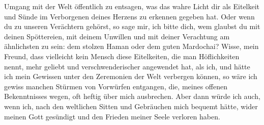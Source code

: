 Umgang mit der Welt öffentlich zu entsagen, was das wahre Licht dir als
Eitelkeit und Sünde im Verborgenen deines Herzens zu
erkennen gegeben hat. Oder
wenn du zu unseren Verächtern gehörst, so sage mir, ich bitte dich, wem glaubst
du mit deinen Spöttereien, mit deinem Unwillen und mit deiner Verachtung am
ähnlichsten zu sein: dem stolzen Haman
 oder dem guten Mardochai? Wisse, mein
Freund, dass vielleicht kein Mensch diese Eitelkeiten, die man Höflichkeiten
nennt, mehr geliebt und verschwenderischer angewendet hat, als ich, und hätte
ich mein Gewissen unter den Zeremonien der Welt verbergen können, so wäre ich
gewiss manchen Stürmen von Vorwürfen entgangen, die, meines offenen
Bekenntnisses
wegen, oft heftig über mich ausbrechen. Aber dann würde ich auch, wenn ich, nach
den weltlichen Sitten und Gebräuchen mich bequemt
hätte, wider meinen Gott
gesündigt und den Frieden meiner Seele verloren haben.

\medskip

